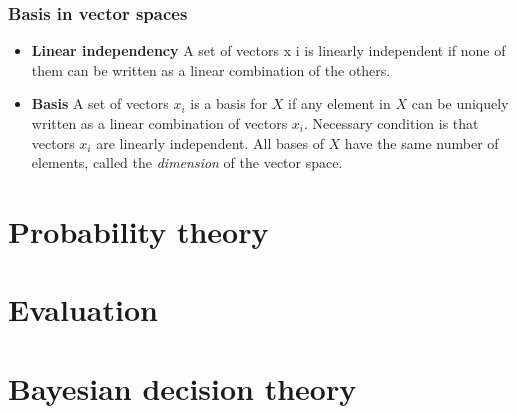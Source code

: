 \documentclass[a4paper, 10pt, titlepage]{article}
\begin{document}
\subsubsection{Basis in vector spaces}
\begin{itemize}
\item \textbf{Linear independency} A set of vectors x i is linearly independent if none of them can be written as a linear combination of the others.
\item \textbf{Basis} A set of vectors $x_i$ is a basis for $X$ if any element in $X$ can be uniquely written as a linear combination of vectors $x_i$. Necessary condition is that vectors $x_i$ are linearly independent. All bases of $X$ have the same number of elements, called the \textit{dimension} of the vector space.
\end{itemize}


\newpage
\section{Probability theory}
\section{Evaluation}
\section{Bayesian decision theory}
\end{document}
